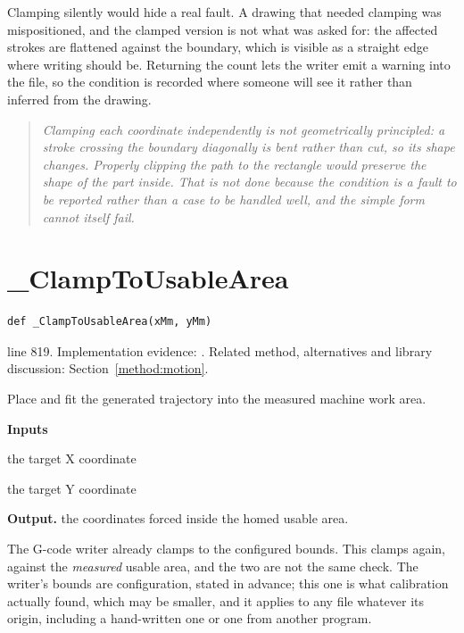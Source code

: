 Clamping silently would hide a real fault. A drawing that needed clamping was mispositioned, and the clamped version is not what was asked for: the affected strokes are flattened against the boundary, which is visible as a straight edge where writing should be. Returning the count lets the writer emit a warning into the file, so the condition is recorded where someone will see it rather than inferred from the drawing.


\begin{quote}\small\itshape Clamping each coordinate independently is not geometrically principled: a stroke crossing the boundary diagonally is bent rather than cut, so its shape changes. Properly clipping the path to the rectangle would preserve the shape of the part inside. That is not done because the condition is a fault to be reported rather than a case to be handled well, and the simple form cannot itself fail.\end{quote}


\section{\_ClampToUsableArea}\label{fn:reproduce:-ClampToUsableArea}
\begin{lstlisting}[style=sig]
def _ClampToUsableArea(xMm, yMm)
\end{lstlisting}
 line 819. Implementation evidence: \cite{code2026}. Related method, alternatives and library discussion: Section~\ref{method:motion}.


Place and fit the generated trajectory into the measured machine work area.




\noindent\textbf{Inputs}
\begin{description}[leftmargin=2.2em,style=nextline,font=\normalfont\ttfamily]\setlength\itemsep{1pt}
  \item[{xMm}] \normalfont the target X coordinate
  \item[{yMm}] \normalfont the target Y coordinate
\end{description}

\noindent\textbf{Output.} the coordinates forced inside the homed usable area.


The G-code writer already clamps to the configured bounds. This clamps again, against the \emph{measured} usable area, and the two are not the same check. The writer's bounds are configuration, stated in advance; this one is what calibration actually found, which may be smaller, and it applies to any file whatever its origin, including a hand-written one or one from another program.

